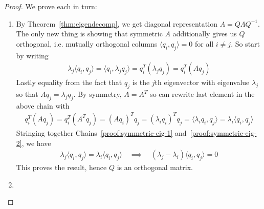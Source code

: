 \documentclass[12pt]{article}
\numberwithin{equation}{section} %
\theoremstyle{plain}
\theoremstyle{definition}
\theoremstyle{remark}
\begin{document}
\clearpage
\begin{proof}
We prove each in turn:
\begin{enumerate}[label=(\roman*)]
  \item
    By Theorem~\ref{thm:eigendecomp}, we get diagonal representation
    $A=Q\Lambda Q^{-1}$. The only new thing is showing that symmetric
    $A$ additionally gives us $Q$ orthogonal, i.e.  mutually orthogonal
    columns $\langle q_i,q_j\rangle=0$ for all $i\neq j$.
    So start by writing
    \begin{align}
      \lambda_j \langle q_i, q_j \rangle
      =
      \langle q_i, \lambda_j q_j \rangle
      = q_i^T (\lambda_j q_j)
      = q_i^T (A q_j)
      \label{proof:symmetric-eig-1}
    \end{align}
    Lastly equality from the fact that $q_j$ is the $j$th eigenvector
    with eigenvalue $\lambda_j$ so that $Aq_j=\lambda_j q_j$. By
    symmetry, $A=A^T$ so can rewrite last element in the above chain
    with
    \begin{align}
      q_i^T (A q_j)
      = q_i^T (A^T q_j)
      = (Aq_i)^T q_j
      = (\lambda_i q_i)^T q_j
      = \langle \lambda_i q_i, q_j \rangle
      = \lambda_i \langle q_i, q_j \rangle
      \label{proof:symmetric-eig-2}
    \end{align}
    Stringing together Chains~\ref{proof:symmetric-eig-1}
    and~\ref{proof:symmetric-eig-2}, we have
    \begin{align*}
      \lambda_j \langle q_i, q_j \rangle
      = \lambda_i \langle q_i, q_j \rangle
      \quad\implies\quad
      (\lambda_j-\lambda_i) \langle q_i, q_j \rangle
      = 0
    \end{align*}
    This proves the result, hence $Q$ is an orthogonal matrix.
  \item


\end{enumerate}
\end{proof}
\end{document}
